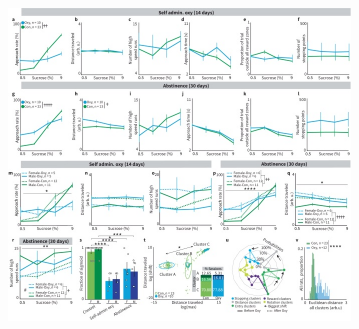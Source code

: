 \documentclass{article}
\begin{document}
\vspace{1em}

\begin{figure}
  \centering
  \includegraphics[width=\textwidth]{Figs/Record_main_4.pdf}
  \label{fig:Record_main_4}
\end{figure}

\clearpage
\end{document}
